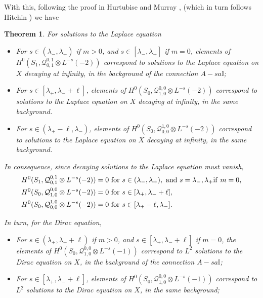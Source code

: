 \documentclass[12pt]{article}
\newtheorem{theorem}{Theorem}[section]
\theoremstyle{definition}
\theoremstyle{remark}
\numberwithin{theorem}{section}
\def\bI{{\mathbb {I}}}
\def\pQ{{\mathcal Q}}
\begin{document}
With this, following the proof in Hurtubise and Murray \cite[Prop 1.17]{HurtubiseMurray}, (which in turn follows Hitchin \cite{Hitchin:1983ay}) we have
\begin{theorem} \label{vanishing} For solutions to the Laplace equation
\begin{itemize}
\item For $s\in (\lambda_-, \lambda_+)$ if $m>0$, and $s\in [\lambda_-, \lambda_+]$ if $m=0$, elements of $H^0(S_1, \pQ_{0,1}^{0,1}\otimes L^{-s}(-2))$ correspond to  solutions to the Laplace equation on $X$ decaying at infinity, in the  background of the connection $A-sa\bI$;
\item For $s\in [\lambda_+, \lambda_- +\ell]$,  elements of $H^0(S_0, \pQ_{1,0}^{0,0}\otimes L^{-s}(-2))$ correspond to solutions to the Laplace equation on $X$ decaying at infinity, in the same background.
\item For $s\in (\lambda_+-\ell, \lambda_-  )$, elements of $H^0(S_0, \pQ_{0,0}^{1,0}\otimes L^{-s}(-2))$ correspond to  solutions to the Laplace equation on $X$ decaying at infinity, in the same background.
\end{itemize}

In consequence, since decaying solutions to the Laplace equation must vanish, 
\begin{align}   H^0(S_1, \pQ_{0,1}^{0,1}\otimes L^{-s}(-2))&  =0\ {\rm for}\ s\in  (\lambda_-, \lambda_+),\  {\rm and}\  s = \lambda_-, \lambda_+ {\rm if}\  m=0,  \\
H^0(S_0, \pQ_{1,0}^{0,0}\otimes L^{-s}(-2))& = 0 \ {\rm for}\ s\in [\lambda_+, \lambda_- +\ell],\\
 H^0(S_0, \pQ_{0,0}^{1,0}\otimes L^{-s}(-2))& = 0 \ {\rm for}\ s\in [\lambda_+-\ell, \lambda_-  ].
\end{align}

In turn, for the Dirac equation,
\begin{itemize}
\item For $s\in (\lambda_+, \lambda_- +\ell)$ if $m>0$, and $s\in [\lambda_+, \lambda_- +\ell]$ if $m=0$,
the elements of $H^0(S_0, \pQ_{1,0}^{0,0}\otimes L^{-s}(-1))$ correspond to $L^2$ solutions to the Dirac equation on $X$, in the background of the connection $A-sa\bI$;

\item For $s\in [\lambda_+, \lambda_- +\ell]$, 
  elements of $H^0(S_0, \pQ_{1,0}^{0,0}\otimes L^{-s}(-1))$ correspond to $L^2$ solutions to the Dirac equation on $X$, in the same background;
  

\end{itemize}
\end{theorem}
\end{document}

